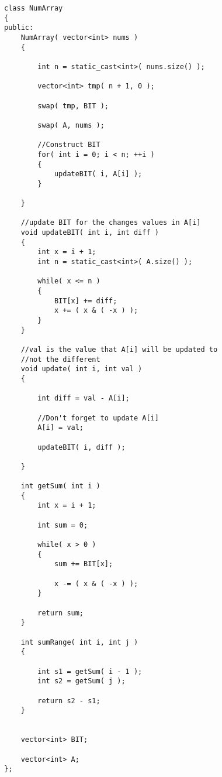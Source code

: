 \begin{lstlisting}[style=customc, caption={BIT}]
class NumArray
{
public:
    NumArray( vector<int> nums )
    {

        int n = static_cast<int>( nums.size() );

        vector<int> tmp( n + 1, 0 );

        swap( tmp, BIT );

        swap( A, nums );

        //Construct BIT
        for( int i = 0; i < n; ++i )
        {
            updateBIT( i, A[i] );
        }

    }

    //update BIT for the changes values in A[i]
    void updateBIT( int i, int diff )
    {
        int x = i + 1;
        int n = static_cast<int>( A.size() );

        while( x <= n )
        {
            BIT[x] += diff;
            x += ( x & ( -x ) );
        }
    }

    //val is the value that A[i] will be updated to
    //not the different
    void update( int i, int val )
    {

        int diff = val - A[i];

        //Don't forget to update A[i]
        A[i] = val;

        updateBIT( i, diff );

    }

    int getSum( int i )
    {
        int x = i + 1;

        int sum = 0;

        while( x > 0 )
        {
            sum += BIT[x];

            x -= ( x & ( -x ) );
        }

        return sum;
    }

    int sumRange( int i, int j )
    {

        int s1 = getSum( i - 1 );
        int s2 = getSum( j );

        return s2 - s1;
    }


    vector<int> BIT;

    vector<int> A;
};

\end{lstlisting}
